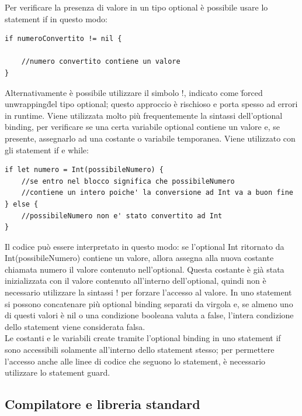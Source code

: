 Per verificare la presenza di valore in un tipo optional è possibile usare lo statement if in questo modo: 
\lstset{language=[Objective]C, breakindent=40pt, breaklines}
\begin{lstlisting}
if numeroConvertito != nil {

	//numero convertito contiene un valore
}
\end{lstlisting}
Alternativamente è possibile utilizzare il simbolo !, indicato come \"forced unwrapping\" del tipo optional; questo approccio è rischioso e porta spesso ad errori in runtime.
Viene utilizzata molto più frequentemente la sintassi dell'optional binding, per verificare se una certa variabile optional contiene un valore e, se presente, assegnarlo ad una costante o variabile temporanea. Viene utilizzato con gli statement if e while:
\begin{lstlisting}
if let numero = Int(possibileNumero) {
	//se entro nel blocco significa che possibileNumero 
	//contiene un intero poiche' la conversione ad Int va a buon fine
} else {
	//possibileNumero non e' stato convertito ad Int
}
\end{lstlisting}
Il codice può essere interpretato in questo modo: se l'optional Int ritornato da Int(possibileNumero) contiene un valore, allora assegna alla nuova costante chiamata numero il valore contenuto nell'optional. Questa costante è già stata inizializzata con il valore contenuto all'interno dell'optional, quindi non è necessario utilizzare la sintassi ! per forzare l'accesso al valore. In uno statement si possono concatenare più optional binding separati da virgola e, se almeno uno di questi valori è nil o una condizione booleana valuta a false, l'intera condizione dello statement viene considerata falsa.\\
Le costanti e le variabili create tramite l'optional binding in uno statement if sono accessibili solamente all'interno dello statement stesso; per permettere l'accesso anche alle linee di codice che seguono lo statement, è necessario utilizzare lo statement guard. 
\subsection{Compilatore e libreria standard}
